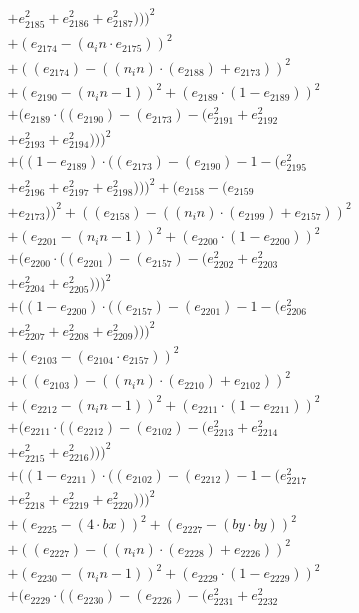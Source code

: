 \documentclass[10pt, a4paper]{article}
\begin{document}
\begin{align*}
& + e_{2185}^{2} + e_{2186}^{2} + e_{2187}^{2})))^{2} \\
& + (e_{2174} - (a_in  \cdot  e_{2175}))^{2} \\
& + ((e_{2174}) - ((n_in)  \cdot  (e_{2188}) + e_{2173}))^{2} \\
& + (e_{2190} - (n_in - 1))^{2} + (e_{2189}  \cdot  (1 - e_{2189}))^{2} \\
& + (e_{2189}  \cdot  ((e_{2190}) - (e_{2173}) - (e_{2191}^{2} + e_{2192}^{2} \\
& + e_{2193}^{2} + e_{2194}^{2})))^{2} \\
& + ((1 - e_{2189})  \cdot  ((e_{2173}) - (e_{2190}) - 1 - (e_{2195}^{2} \\
& + e_{2196}^{2} + e_{2197}^{2} + e_{2198}^{2})))^{2} + (e_{2158} - (e_{2159} \\
& + e_{2173}))^{2} + ((e_{2158}) - ((n_in)  \cdot  (e_{2199}) + e_{2157}))^{2} \\
& + (e_{2201} - (n_in - 1))^{2} + (e_{2200}  \cdot  (1 - e_{2200}))^{2} \\
& + (e_{2200}  \cdot  ((e_{2201}) - (e_{2157}) - (e_{2202}^{2} + e_{2203}^{2} \\
& + e_{2204}^{2} + e_{2205}^{2})))^{2} \\
& + ((1 - e_{2200})  \cdot  ((e_{2157}) - (e_{2201}) - 1 - (e_{2206}^{2} \\
& + e_{2207}^{2} + e_{2208}^{2} + e_{2209}^{2})))^{2} \\
& + (e_{2103} - (e_{2104}  \cdot  e_{2157}))^{2} \\
& + ((e_{2103}) - ((n_in)  \cdot  (e_{2210}) + e_{2102}))^{2} \\
& + (e_{2212} - (n_in - 1))^{2} + (e_{2211}  \cdot  (1 - e_{2211}))^{2} \\
& + (e_{2211}  \cdot  ((e_{2212}) - (e_{2102}) - (e_{2213}^{2} + e_{2214}^{2} \\
& + e_{2215}^{2} + e_{2216}^{2})))^{2} \\
& + ((1 - e_{2211})  \cdot  ((e_{2102}) - (e_{2212}) - 1 - (e_{2217}^{2} \\
& + e_{2218}^{2} + e_{2219}^{2} + e_{2220}^{2})))^{2} \\
& + (e_{2225} - (4  \cdot  bx))^{2} + (e_{2227} - (by  \cdot  by))^{2} \\
& + ((e_{2227}) - ((n_in)  \cdot  (e_{2228}) + e_{2226}))^{2} \\
& + (e_{2230} - (n_in - 1))^{2} + (e_{2229}  \cdot  (1 - e_{2229}))^{2} \\
& + (e_{2229}  \cdot  ((e_{2230}) - (e_{2226}) - (e_{2231}^{2} + e_{2232}^{2} \\

\end{align*}
\end{document}
